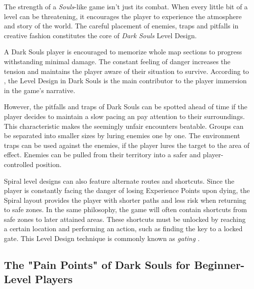 The strength of a \emph{Souls}-like game isn't just its combat. When every little bit of a level can be threatening, it encourages the player to experience the atmosphere and story of the world. The careful placement of enemies, traps and pitfalls in creative fashion constitutes the core of \emph{Dark Souls} Level Design.

A Dark Souls player is encouraged to memorize whole map sections to progress withstanding minimal damage. The constant feeling of danger increases the tension and maintains the player aware of their situation to survive. According to , the Level Design in  Dark Souls is the main contributor to the player immersion in the game's narrative.

However, the pitfalls and traps of Dark Souls can be spotted ahead of time if the player decides to maintain a slow pacing an pay attention to their surroundings. This characteristic makes the seemingly unfair encounters beatable. Groups can be separated into smaller sizes by luring enemies one by one. The environment traps can be used against the enemies, if the player lures the target to the area of effect. Enemies can be pulled from their territory into a safer and player-controlled position.

Spiral level designs can also feature alternate routes and shortcuts. Since the player is constantly facing the danger of losing Experience Points upon dying, the Spiral layout provides the player with shorter paths and less risk when returning to safe zones. In the same philosophy, the game will often contain shortcuts from safe zones to later attained areas. These shortcuts must be unlocked by reaching a certain location and performing an action, such as finding the key to a locked gate. This Level Design technique is commonly known as \emph{gating} \cite{BOOK_LevelUpTheGuideToGreat}.


\subsection{The "Pain Points" of Dark Souls for Beginner-Level Players}


